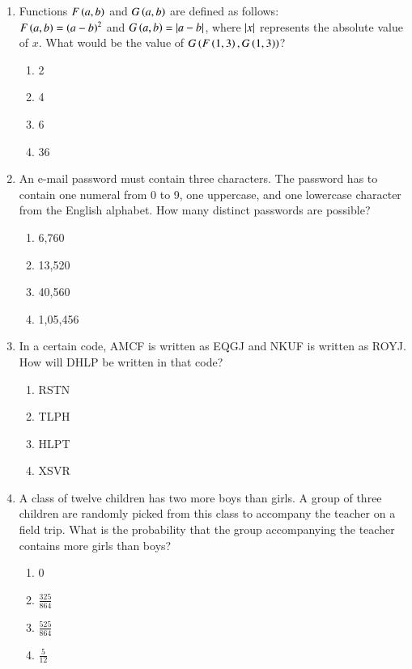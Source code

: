 \documentclass[journal,9pt,onecolumn]{IEEEtran}
\begin{document}
\begin{enumerate}
\item Functions $F\left(a,b\right)$ and $G\left(a,b\right)$ are defined as follows: \\
$F\left(a,b\right) = \left(a-b\right)^2$ and $G\left(a,b\right) = \left\vert a-b\right\vert$, where $\left\vert x\right\vert$ represents the absolute value of $x$. What would be the value of $G\left(F\left(1,3\right), G\left(1,3\right)\right)$? \hfill {}
\begin{multicols}{4}
    \begin{enumerate}
        \item 2 
        \item 4 
        \item 6 
        \item 36 
    \end{enumerate}
\end{multicols}

\item An e-mail password must contain three characters. The password has to contain one numeral from 0 to 9, one uppercase, and one lowercase character from the English alphabet. How many distinct passwords are possible?\hfill {}
\begin{multicols}{4} 
    \begin{enumerate}
        \item 6,760 
        \item 13,520 
        \item 40,560 
        \item 1,05,456 
    \end{enumerate}
\end{multicols}

\item In a certain code, AMCF is written as EQGJ and NKUF is written as ROYJ. How will DHLP be written in that code? \hfill {}
\begin{multicols}{4}
    \begin{enumerate}
        \item RSTN
        \item TLPH
        \item HLPT
        \item XSVR
    \end{enumerate}
\end{multicols}

\item A class of twelve children has two more boys than girls. A group of three children are randomly picked from this class to accompany the teacher on a field trip. What is the probability that the group accompanying the teacher contains more girls than boys? \hfill {}
\begin{multicols}{4}
\begin{enumerate}
    \item 0
    \item $\frac{325}{864}$
    \item $\frac{525}{864}$
    \item $\frac{5}{12}$
\end{enumerate}
\end{multicols}


\end{enumerate}
\end{document}
